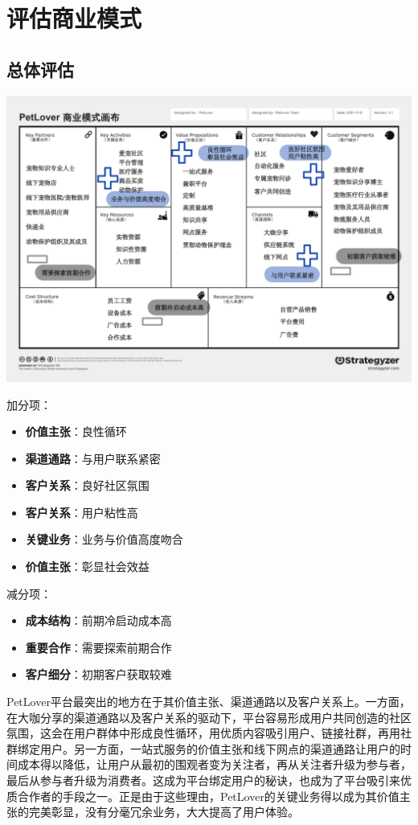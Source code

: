 \documentclass[a4paper]{ctexart}
\begin{document}
\section{评估商业模式}
\subsection{总体评估}
\begin{center}
  \includegraphics[scale=0.75]{总体评估.pdf}
\end{center}
加分项：\\
\begin{itemize}
  \item \textbf{价值主张}：良性循环
  \item \textbf{渠道通路}：与用户联系紧密
  \item \textbf{客户关系}：良好社区氛围
  \item \textbf{客户关系}：用户粘性高
  \item \textbf{关键业务}：业务与价值高度吻合
  \item \textbf{价值主张}：彰显社会效益
\end{itemize}
减分项：\\
\begin{itemize}
  \item \textbf{成本结构}：前期冷启动成本高
  \item \textbf{重要合作}：需要探索前期合作
  \item \textbf{客户细分}：初期客户获取较难
\end{itemize}

PetLover平台最突出的地方在于其价值主张、渠道通路以及客户关系上。一方面，在大咖分享的渠道通路以及客户关系的驱动下，平台容易形成用户共同创造的社区氛围，这会在用户群体中形成良性循环，用优质内容吸引用户、链接社群，再用社群绑定用户。另一方面，一站式服务的价值主张和线下网点的渠道通路让用户的时间成本得以降低，让用户从最初的围观者变为关注者，再从关注者升级为参与者，最后从参与者升级为消费者。这成为平台绑定用户的秘诀，也成为了平台吸引来优质合作者的手段之一。正是由于这些理由，PetLover的关键业务得以成为其价值主张的完美彰显，没有分毫冗余业务，大大提高了用户体验。
\end{document}
